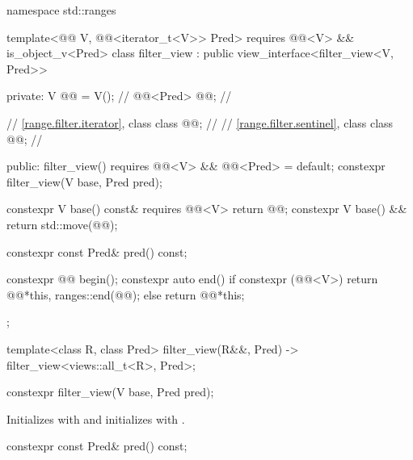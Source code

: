 %
%
%
\begin{codeblock}
namespace std::ranges {
  template<@@ V, @@<iterator_t<V>> Pred>
    requires @@<V> && is_object_v<Pred>
  class filter_view : public view_interface<filter_view<V, Pred>> {
  private:
    V @@ = V();                              // \expos
    @@<Pred> @@;                   // \expos

    // \ref{range.filter.iterator}, class 
    class @@;                             // \expos
    // \ref{range.filter.sentinel}, class 
    class @@;                             // \expos

  public:
    filter_view() requires @@<V> && @@<Pred> = default;
    constexpr filter_view(V base, Pred pred);

    constexpr V base() const& requires @@<V> { return @@; }
    constexpr V base() && { return std::move(@@); }

    constexpr const Pred& pred() const;

    constexpr @@ begin();
    constexpr auto end() {
      if constexpr (@@<V>)
        return @@{*this, ranges::end(@@)};
      else
        return @@{*this};
    }
  };

  template<class R, class Pred>
    filter_view(R&&, Pred) -> filter_view<views::all_t<R>, Pred>;
}
\end{codeblock}

%
\begin{itemdecl}
constexpr filter_view(V base, Pred pred);
\end{itemdecl}

\begin{itemdescr}
\pnum
\effects
Initializes  with  and initializes
 with .
\end{itemdescr}

%
\begin{itemdecl}
constexpr const Pred& pred() const;
\end{itemdecl}

